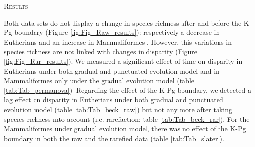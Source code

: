 \documentclass[12pt,letterpaper]{article}
\renewcommand{\section}[1]{%
\bigskip
\begin{center}
\begin{Large}
\normalfont\scshape #1
\medskip
\end{Large}
\end{center}}
\begin{document}
%
%

\section{Results}
Both data sets do not display a change in species richness after and before the K-Pg boundary (Figure \ref{fig:Fig_Raw_results}): respectively a decrease in Eutherians \citep[data from][]{beckancient2014} and an increase in Mammaliformes \citep[data from][]{Slater2012MEE}.
However, this variations in species richness are not linked with changes in disparity (Figure \ref{fig:Fig_Rar_results}).
We measured a significant effect of time on disparity in Eutherians under both gradual and punctuated evolution model and in Mammaliformes only under the gradual evolution model (table \ref{tab:Tab_permanova}).
Regarding the effect of the K-Pg boundary, we detected a lag effect on disparity in Eutherians under both gradual and punctuated evolution model (table \ref{tab:Tab_beck_raw}) but not any more after taking species richness into account (i.e. rarefaction; table \ref{tab:Tab_beck_rar}).
For the Mammaliformes under gradual evolution model, there was no effect of the K-Pg boundary in both the raw and the rarefied data (table \ref{tab:Tab_slater}).
\end{document}
